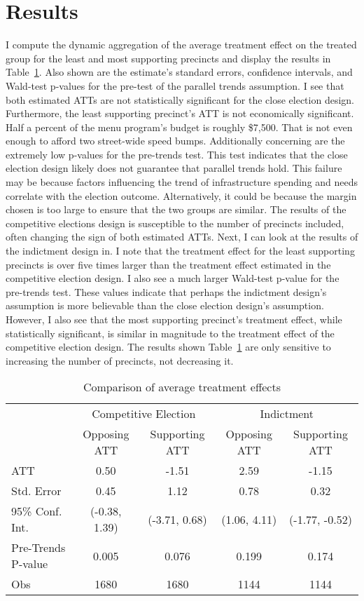 \section{Results}\label{sec:results}


I compute the dynamic aggregation of the average treatment effect on the treated group for the least and most supporting precincts and display the results in Table~\ref{tab:att_comparison_combined}.
Also shown are the estimate's standard errors, confidence intervals, and Wald-test p-values for the pre-test of the parallel trends assumption.
I see that both estimated ATTs are not statistically significant for the close election design.
Furthermore, the least supporting precinct's ATT is not economically significant. 
Half a percent of the menu program's budget is roughly \$7,500. 
That is not even enough to afford two street-wide speed bumps.
Additionally concerning are the extremely low p-values for the pre-trends test.
This test indicates that the close election design likely does not guarantee that parallel trends hold.
This failure may be because factors influencing the trend of infrastructure spending and needs correlate with the election outcome.
Alternatively, it could be because the margin chosen is too large to ensure that the two groups are similar.
The results of the competitive elections design is susceptible to the number of precincts included, often changing the sign of both estimated ATTs.
Next, I can look at the results of the indictment design in.
I note that the treatment effect for the least supporting precincts is over five times larger than the treatment effect estimated in the competitive election design.
I also see a much larger Wald-test p-value for the pre-trends test.
These values indicate that perhaps the indictment design's assumption is more believable than the close election design's assumption.
However, I also see that the most supporting precinct's treatment effect, while statistically significant, is similar in magnitude to the treatment effect of the competitive election design.
The results shown Table~\ref{tab:att_comparison_combined} are only sensitive to increasing the number of precincts, not decreasing it.


\begin{table}[ht]
    \centering
    \caption{Comparison of average treatment effects}
    \label{tab:att_comparison_combined}
    \begin{tabular}{lcc|cc}
    \hline
     & \multicolumn{2}{c|}{Competitive Election} & \multicolumn{2}{c}{Indictment} \\
     & Opposing ATT & Supporting ATT & Opposing ATT & Supporting ATT \\
    \hline
    ATT & 0.50 & -1.51 & 2.59 & -1.15 \\
    Std. Error & 0.45 & 1.12 & 0.78 & 0.32 \\
    95\% Conf. Int. & (-0.38, 1.39) & (-3.71, 0.68) & (1.06, 4.11) & (-1.77, -0.52) \\
    Pre-Trends P-value & 0.005  & 0.076 & 0.199 & 0.174 \\
    Obs & 1680 & 1680 & 1144 & 1144 \\
    \hline
    \end{tabular}
\end{table}

